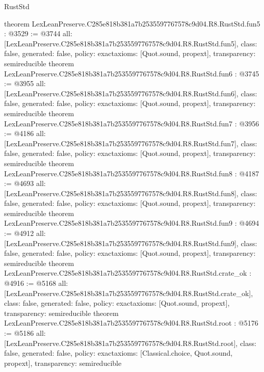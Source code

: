 \begin{lexlean}{RustStd}
\begin{coremodule}
{}
theorem LexLeanPreserve.C285e818b381a7b2535597767578c9d04.R8.RustStd.fun5 : @3529 := @3744 {
  all: [LexLeanPreserve.C285e818b381a7b2535597767578c9d04.R8.RustStd.fun5],
  class: false,
  generated: false,
  policy: exact{axioms: [Quot.sound, propext]},
  transparency: semireducible
}
theorem LexLeanPreserve.C285e818b381a7b2535597767578c9d04.R8.RustStd.fun6 : @3745 := @3955 {
  all: [LexLeanPreserve.C285e818b381a7b2535597767578c9d04.R8.RustStd.fun6],
  class: false,
  generated: false,
  policy: exact{axioms: [Quot.sound, propext]},
  transparency: semireducible
}
theorem LexLeanPreserve.C285e818b381a7b2535597767578c9d04.R8.RustStd.fun7 : @3956 := @4186 {
  all: [LexLeanPreserve.C285e818b381a7b2535597767578c9d04.R8.RustStd.fun7],
  class: false,
  generated: false,
  policy: exact{axioms: [Quot.sound, propext]},
  transparency: semireducible
}
theorem LexLeanPreserve.C285e818b381a7b2535597767578c9d04.R8.RustStd.fun8 : @4187 := @4693 {
  all: [LexLeanPreserve.C285e818b381a7b2535597767578c9d04.R8.RustStd.fun8],
  class: false,
  generated: false,
  policy: exact{axioms: [Quot.sound, propext]},
  transparency: semireducible
}
theorem LexLeanPreserve.C285e818b381a7b2535597767578c9d04.R8.RustStd.fun9 : @4694 := @4912 {
  all: [LexLeanPreserve.C285e818b381a7b2535597767578c9d04.R8.RustStd.fun9],
  class: false,
  generated: false,
  policy: exact{axioms: [Quot.sound, propext]},
  transparency: semireducible
}
theorem LexLeanPreserve.C285e818b381a7b2535597767578c9d04.R8.RustStd.crate_ok : @4916 := @5168 {
  all: [LexLeanPreserve.C285e818b381a7b2535597767578c9d04.R8.RustStd.crate_ok],
  class: false,
  generated: false,
  policy: exact{axioms: [Quot.sound, propext]},
  transparency: semireducible
}
theorem LexLeanPreserve.C285e818b381a7b2535597767578c9d04.R8.RustStd.root : @5176 := @5186 {
  all: [LexLeanPreserve.C285e818b381a7b2535597767578c9d04.R8.RustStd.root],
  class: false,
  generated: false,
  policy: exact{axioms: [Classical.choice, Quot.sound, propext]},
  transparency: semireducible
}


\end{coremodule}
\end{lexlean}
